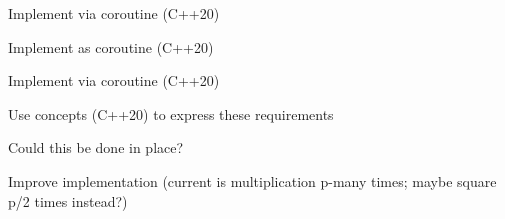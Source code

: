 
\begin{DoxyRefList}
\item[Class \mbox{\hyperlink{classsymmp_1_1CombinationGenerator}{Combination\+Generator$<$ T $>$}} ]\label{todo__todo000003}%
%
Implement via coroutine (C++20)  
\item[Class \mbox{\hyperlink{classsymmp_1_1FactoryGenerator}{Factory\+Generator$<$ spec\+\_\+t, gen\+\_\+t $>$}} ]\label{todo__todo000001}%
%
Implement as coroutine (C++20)  
\item[Class \mbox{\hyperlink{classsymmp_1_1PermutationGenerator}{Permutation\+Generator$<$ T $>$}} ]\label{todo__todo000002}%
%
Implement via coroutine (C++20)  
\item[Class \mbox{\hyperlink{classsymmp_1_1Polynomial}{Polynomial$<$ \+\_\+scl, \+\_\+exp, \+\_\+cnt, \+\_\+ord, \+\_\+arg $>$}} ]\label{todo__todo000004}%
%
Use concepts (C++20) to express these requirements 
\item[Member \mbox{\hyperlink{classsymmp_1_1Polynomial_a3952b5f6fd4e4511308c25378410a681}{Polynomial$<$ \+\_\+scl, \+\_\+exp, \+\_\+cnt, \+\_\+ord, \+\_\+arg $>$\+::operator$\ast$=}} (const \mbox{\hyperlink{classsymmp_1_1Polynomial}{Polynomial}} \&other)]\label{todo__todo000005}%
%
Could this be done in place?  
\item[Member \mbox{\hyperlink{classsymmp_1_1Polynomial_a70067a1e044cd9ad3172e18f870555d8}{Polynomial$<$ \+\_\+scl, \+\_\+exp, \+\_\+cnt, \+\_\+ord, \+\_\+arg $>$\+::operator$^\wedge$}} (T p) const]\label{todo__todo000006}%
%
Improve implementation (current is multiplication p-\/many times; maybe square p/2 times instead?) 
\end{DoxyRefList}